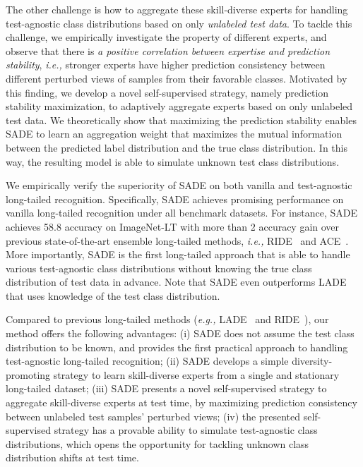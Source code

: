 \documentclass{article}
\def\eg{\emph{e.g.}} \def\Eg{\emph{E.g.}}
\def\ie{\emph{i.e.}} \def\Ie{\emph{I.e.}}
\def\ie{\emph{i.e., }}
\def\eg{\emph{e.g., }}
\begin{document}
 
 


The  other challenge  is how to aggregate these   skill-diverse experts for handling test-agnostic class distributions based on only \emph{unlabeled test data}.
To tackle this challenge, we empirically investigate the property of different experts, and   observe that there is \emph{a positive correlation between  expertise and prediction stability}, \ie stronger experts have higher prediction consistency between  different perturbed views of samples from their favorable classes.   
Motivated by this finding, we develop  a novel  self-supervised strategy, namely prediction stability maximization,    to adaptively aggregate  experts  based on only  unlabeled test data. 
We theoretically show that  maximizing the prediction stability  enables SADE to learn an aggregation weight that maximizes  the mutual information between the predicted
label distribution     and the true class distribution. In this way, the resulting  model is able to   simulate  unknown  test class distributions.
  
We empirically verify the superiority of SADE on both vanilla and test-agnostic long-tailed recognition. Specifically,  SADE achieves promising performance on   vanilla long-tailed recognition under all benchmark datasets.   For instance, SADE achieves 58.8   accuracy  on ImageNet-LT with more than 2   accuracy gain over previous state-of-the-art  ensemble long-tailed methods, \ie RIDE~\cite{wang2020long} and ACE~\cite{cai2021ace}. 
More importantly,  SADE is the first long-tailed approach that is able to handle various  test-agnostic class distributions without knowing the true class   distribution  of  test data in advance. Note that  SADE even outperforms LADE~\cite{hong2020disentangling} that uses      knowledge of the test class distribution.

Compared to previous long-tailed methods (\eg LADE~\cite{hong2020disentangling} and RIDE~\cite{wang2020long}), our method   offers the following advantages: (i) SADE does not assume the   test class distribution to be  known, and  provides the first practical approach to handling test-agnostic long-tailed recognition; (ii) SADE develops a simple diversity-promoting strategy to learn   skill-diverse experts from a  single and stationary long-tailed dataset;  (iii) SADE presents a novel self-supervised strategy to  aggregate skill-diverse experts at test time, by maximizing prediction consistency  between    unlabeled test samples'   perturbed views; (iv) the presented self-supervised strategy has a provable ability to  simulate     test-agnostic class distributions, which opens the opportunity for tackling unknown  class distribution shifts at test time. 
 
\end{document}

